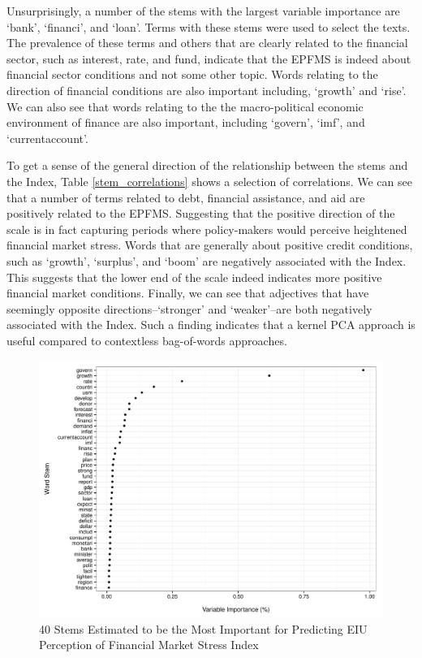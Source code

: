 \documentclass[]{article}
\begin{document}
Unsurprisingly, a number of the stems with the largest variable importance are `bank', `financi', and `loan'. Terms with these stems were used to select the texts. The prevalence of these terms and others that are clearly related to the financial sector, such as interest, rate, and fund, indicate that the EPFMS is indeed about financial sector conditions and not some other topic. Words relating to the direction of financial conditions are also important including, `growth' and `rise'. We can also see that words relating to the the macro-political economic environment of finance are also important, including `govern', `imf', and `currentaccount'.

To get a sense of the general direction of the relationship between the stems and the Index, Table \ref{stem_correlations} shows a selection of correlations. We can see that a number of terms related to debt, financial assistance, and aid are positively related to the EPFMS. Suggesting that the positive direction of the scale is in fact capturing periods where policy-makers would perceive heightened financial market stress. Words that are generally about positive credit conditions, such as `growth', `surplus', and `boom' are negatively associated with the Index. This suggests that the lower end of the scale indeed indicates more positive financial market conditions. Finally, we can see that adjectives that have seemingly opposite directions--`stronger' and `weaker'--are both negatively associated with the Index. Such a finding indicates that a kernel PCA approach is useful compared to contextless bag-of-words approaches.

\begin{figure}
    \caption{40 Stems Estimated to be the Most Important for Predicting EIU Perception of Financial Market Stress Index}
    \label{rf_importance}

    \begin{center}
        \includegraphics[scale=0.5]{analysis/figures/rf_stem_importance.pdf}
    \end{center}

\end{figure}
\end{document}
